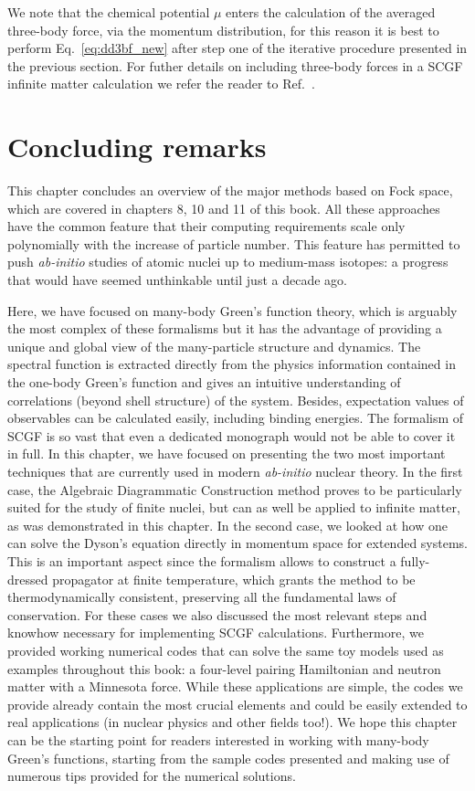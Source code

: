 We note that the chemical potential $\mu$ enters the calculation of the averaged three-body force, via the momentum distribution, for this reason it is best to perform Eq.~\eqref{eq:dd3bf_new} after step one of the iterative procedure presented in the previous section. For futher details on including three-body forces in a SCGF infinite matter calculation we refer the reader to Ref.~\cite{ch11_Carbone2014PhD}.


\section{Concluding remarks}
This chapter concludes an overview of the major methods based on Fock space, which are covered in chapters 8, 10 and 11 of this book. All these approaches have the common feature that their computing requirements scale only polynomially with the increase of particle number. This feature has permitted to push {\em ab-initio} studies of atomic nuclei up to medium-mass isotopes: a progress that would have seemed unthinkable until just a decade ago. 
%

Here, we have focused on many-body Green's function theory, which is arguably the most complex of these formalisms but it has the advantage of providing a unique and global view of the many-particle structure and dynamics.   The spectral function is extracted directly from the physics information contained in the one-body Green's function and gives an intuitive understanding of correlations (beyond shell structure) of the system. Besides, expectation values of observables can be calculated easily, including binding energies.
%
The formalism of SCGF is so vast that even a dedicated monograph would not be able to cover it in full. In this chapter, we have focused on presenting the two most important techniques that are currently used in modern {\em ab-initio} nuclear theory.
 In the first case, the Algebraic Diagrammatic Construction method proves to be particularly suited for the study of finite nuclei, but can as well be applied to infinite matter, as was demonstrated in this chapter. In the second case, we looked at how one can solve the  Dyson's equation directly in momentum space for extended systems.  This is an important aspect since the formalism allows to construct a fully-dressed propagator at finite temperature, which grants the method to be thermodynamically consistent, preserving all the fundamental laws of conservation. 
%
%
For these cases we also discussed the most relevant steps and knowhow necessary for implementing SCGF calculations. Furthermore, we provided working numerical codes that can solve the same toy models used as examples throughout this book: a four-level pairing Hamiltonian and neutron matter with a Minnesota force.   While these applications are simple, the codes we provide already contain the most crucial elements and could be easily extended to real applications (in nuclear physics and other fields too!). We hope this chapter can be the starting point for readers interested in working with many-body Green's functions, starting from the sample codes presented and making use of numerous tips provided for the numerical solutions.


